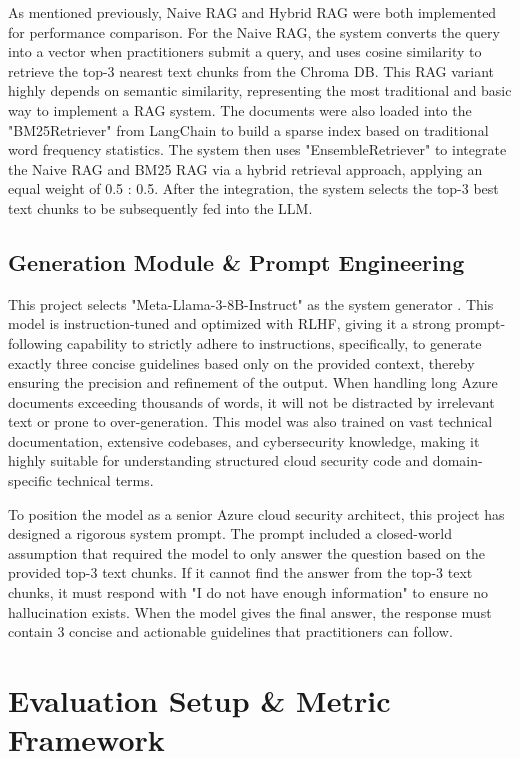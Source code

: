 \documentclass[11pt]{article}
\begin{document}
As mentioned previously, Naive RAG and Hybrid RAG were both implemented for performance comparison. For the Naive RAG, the system converts the query into a vector when practitioners submit a query, and uses cosine similarity to retrieve the top-3 nearest text chunks from the Chroma DB. This RAG variant highly depends on semantic similarity, representing the most traditional and basic way to implement a RAG system. The documents were also loaded into the "BM25Retriever" from LangChain to build a sparse index based on traditional word frequency statistics. The system then uses "EnsembleRetriever" to integrate the Naive RAG and BM25 RAG via a hybrid retrieval approach, applying an equal weight of 0.5 : 0.5. After the integration, the system selects the top-3 best text chunks to be subsequently fed into the LLM.

\subsection{Generation Module \& Prompt Engineering}

This project selects "Meta-Llama-3-8B-Instruct" as the system generator \citep{dubey2024llama3}. This model is instruction-tuned and optimized with RLHF, giving it a strong prompt-following capability to strictly adhere to instructions, specifically, to generate exactly three concise guidelines based only on the provided context, thereby ensuring the precision and refinement of the output. When handling long Azure documents exceeding thousands of words, it will not be distracted by irrelevant text or prone to over-generation. This model was also trained on vast technical documentation, extensive codebases, and cybersecurity knowledge, making it highly suitable for understanding structured cloud security code and domain-specific technical terms.

To position the model as a senior Azure cloud security architect, this project has designed a rigorous system prompt. The prompt included a closed-world assumption that required the model to only answer the question based on the provided top-3 text chunks. If it cannot find the answer from the top-3 text chunks, it must respond with "I do not have enough information" to ensure no hallucination exists. When the model gives the final answer, the response must contain 3 concise and actionable guidelines that practitioners can follow.

\section{Evaluation Setup \& Metric Framework}
\end{document}

